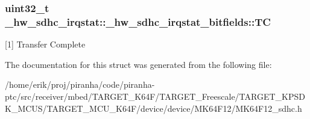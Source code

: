 \subsubsection[{\texorpdfstring{TC}{TC}}]{\setlength{\rightskip}{0pt plus 5cm}uint32\+\_\+t \+\_\+hw\+\_\+sdhc\+\_\+irqstat\+::\+\_\+hw\+\_\+sdhc\+\_\+irqstat\+\_\+bitfields\+::\+TC}\hypertarget{struct__hw__sdhc__irqstat_1_1__hw__sdhc__irqstat__bitfields_ac4cc8799054f3df04685bb60643a5af6}{}\label{struct__hw__sdhc__irqstat_1_1__hw__sdhc__irqstat__bitfields_ac4cc8799054f3df04685bb60643a5af6}
\mbox{[}1\mbox{]} Transfer Complete 

The documentation for this struct was generated from the following file\+:\begin{DoxyCompactItemize}
\item 
/home/erik/proj/piranha/code/piranha-\/ptc/src/receiver/mbed/\+T\+A\+R\+G\+E\+T\+\_\+\+K64\+F/\+T\+A\+R\+G\+E\+T\+\_\+\+Freescale/\+T\+A\+R\+G\+E\+T\+\_\+\+K\+P\+S\+D\+K\+\_\+\+M\+C\+U\+S/\+T\+A\+R\+G\+E\+T\+\_\+\+M\+C\+U\+\_\+\+K64\+F/device/device/\+M\+K64\+F12/M\+K64\+F12\+\_\+sdhc.\+h\end{DoxyCompactItemize}
